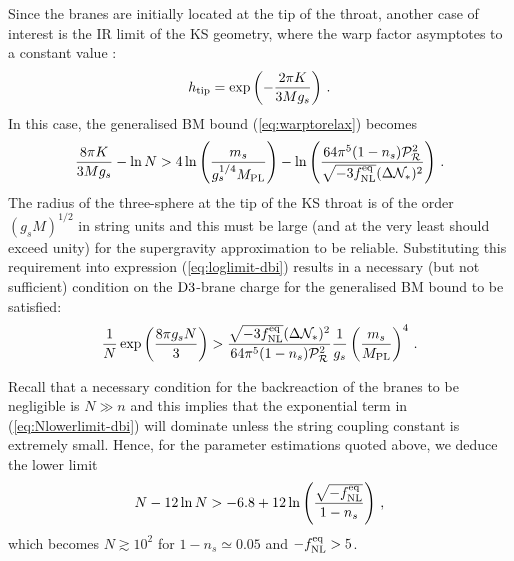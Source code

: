 Since the branes are initially located at the tip of the 
throat, another case of interest is the IR limit of the KS geometry, where 
the warp factor asymptotes to a constant value 
\cite{gkp}:
% 
\begin{equation}
\label{eq:KStip-dbi}
h_{\rm tip} = \exp \left( - \frac{2\pi K}{3Mg_s} \right) \,.
\end{equation}
% 
In this case, the generalised BM bound (\ref{eq:warptorelax}) becomes
%  
\begin{equation}
\label{eq:loglimit-dbi}
\frac{8\pi K}{3Mg_s} -\ln N > 4 \ln \left( \frac{m_s}{g_s^{1/4}M_{\mathrm{PL}}} \right)
-\ln \left( 
\frac{64\pi^5 (1-n_s)\mathcal{P}_{\mathcal{R}}^2 }{\sqrt{-3f_{\mathrm{NL}}^{\mathrm{eq}}} ( \Delta \mathcal{N}_*)^2}
\right) \,.
\end{equation}
% 
The radius of the three-sphere at the tip of the KS 
throat is of the order $(g_sM)^{1/2}$ in string units 
and this must be large (and at the very least should exceed
unity) for the supergravity approximation to be reliable. 
Substituting this requirement into expression (\ref{eq:loglimit-dbi}) 
results in a necessary (but not sufficient) condition 
on the ${\rm D3}$-brane charge for the 
generalised BM bound to be satisfied:
%  
\begin{equation}
\label{eq:Nlowerlimit-dbi}
\frac{1}{N} \exp \left( \frac{8\pi g_s N}{3}  \right)
> \frac{\sqrt{-3f_{\mathrm{NL}}^{\mathrm{eq}}} ( \Delta \mathcal{N}_*)^2}{64\pi^5 
(1-n_s)\mathcal{P}_{\mathcal{R}}^2 } \frac{1}{g_s} \left( \frac{m_s}{M_{\mathrm{PL}}} \right)^4 \,.
\end{equation}
% 


Recall that a necessary condition for the backreaction 
of the branes to be negligible is 
$N \gg n$ and this implies that the 
exponential term in (\ref{eq:Nlowerlimit-dbi}) will dominate unless 
the string coupling constant is extremely small. Hence, for 
the parameter estimations quoted above, we 
deduce the lower limit 
% 
\begin{equation}
\label{eq:Nconstraint-dbi}
N- 12 \ln N > -6.8 +12 \ln \left( \frac{\sqrt{-f_{\mathrm{NL}}^{\mathrm{eq}}}}{1-n_s} \right) \,,
\end{equation}
% 
which becomes $N \gtrsim 10^2$ for $1-n_s \simeq 0.05$ and $-f_{\mathrm{NL}}^{\mathrm{eq}}>5$.



